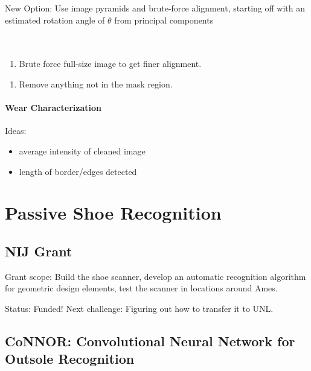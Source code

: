 \documentclass[]{book}
\providecommand{\tightlist}{%
  \setlength{\itemsep}{0pt}\setlength{\parskip}{0pt}}
\let\oldparagraph\paragraph
\renewcommand{\paragraph}[1]{\oldparagraph{#1}\mbox{}}
\begin{document}
New Option: Use image pyramids and brute-force alignment, starting off with an estimated rotation angle of \(\theta\) from principal components\\
~\\
~\\

\begin{enumerate}
\def\labelenumi{\arabic{enumi}.}
\setcounter{enumi}{4}
\tightlist
\item
  Brute force full-size image to get finer alignment.
\end{enumerate}

\begin{enumerate}
\def\labelenumi{\arabic{enumi}.}
\setcounter{enumi}{5}
\tightlist
\item
  Remove anything not in the mask region.
\end{enumerate}

\hypertarget{lss-paper-analysis-wear}{%
\paragraph{Wear Characterization}\label{lss-paper-analysis-wear}}

Ideas:

\begin{itemize}
\tightlist
\item
  average intensity of cleaned image
\item
  length of border/edges detected
\end{itemize}

\hypertarget{connor}{%
\section{Passive Shoe Recognition}\label{connor}}

\hypertarget{nij-grant}{%
\subsection{NIJ Grant}\label{nij-grant}}

Grant scope: Build the shoe scanner, develop an automatic recognition algorithm for geometric design elements, test the scanner in locations around Ames.

Status: Funded! Next challenge: Figuring out how to transfer it to UNL.

\hypertarget{connor-convolutional-neural-network-for-outsole-recognition}{%
\subsection{CoNNOR: Convolutional Neural Network for Outsole Recognition}\label{connor-convolutional-neural-network-for-outsole-recognition}}
\end{document}
